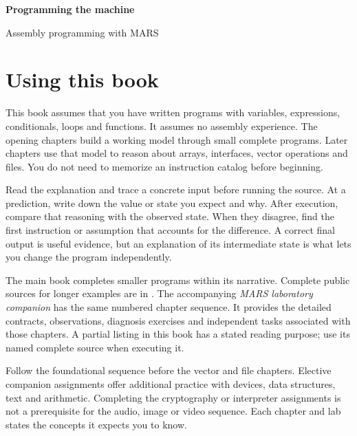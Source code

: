 \begin{titlepage}
  \centering
  \vspace*{30mm}
  {\Huge\bfseries Programming the machine\par}
  \vspace{8mm}
  {\Large Assembly programming with MARS\par}
  \vspace{18mm}
  {\Large\MARSAuthor\par}
  \vfill
  {\MARSEdition\par}
\end{titlepage}

\chapter*{Using this book}
\label{revision:using-learning-book}

This book assumes that you have written programs with variables, expressions,
conditionals, loops and functions. It assumes no assembly experience. The opening
chapters build a working model through small complete programs. Later chapters
use that model to reason about arrays, interfaces, vector operations and files.
You do not need to memorize an instruction catalog before beginning.

Read the explanation and trace a concrete input before running the source. At a
prediction, write down the value or state you expect and why. After execution,
compare that reasoning with the observed state. When they disagree, find the
first instruction or assumption that accounts for the difference. A correct final
output is useful evidence, but an explanation of its intermediate state is what
lets you change the program independently.

The main book completes smaller programs within its narrative. Complete public
sources for longer examples are in . The accompanying
\emph{MARS laboratory companion} has the same numbered chapter sequence. It
provides the detailed contracts, observations, diagnosis exercises and independent
tasks associated with those chapters. A partial listing in this book has a
stated reading purpose; use its named complete source when executing it.

Follow the foundational sequence before the vector and file chapters. Elective
companion assignments offer additional practice with devices, data structures,
text and arithmetic. Completing the cryptography or interpreter assignments is
not a prerequisite for the audio, image or video sequence. Each chapter and lab
states the concepts it expects you to know.

